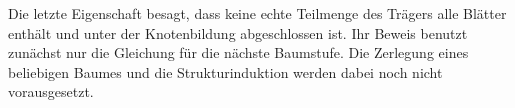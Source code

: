 Die letzte Eigenschaft besagt, dass keine echte Teilmenge des Trägers
alle Blätter enthält und unter der Knotenbildung abgeschlossen ist.
Ihr Beweis benutzt zunächst nur die Gleichung für die nächste
Baumstufe. Die Zerlegung eines beliebigen Baumes und die
Strukturinduktion werden dabei noch nicht vorausgesetzt.

\noindent\begin{minipage}{\linewidth}
\end{minipage}\par
